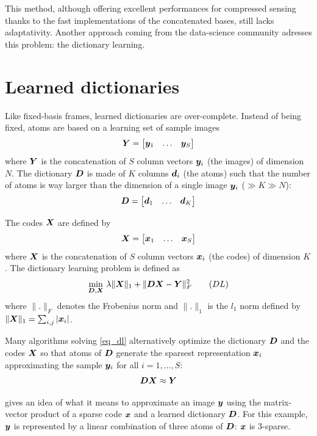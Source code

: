 This method, although offering excellent performances for compressed sensing thanks to the fast implementations of the concatenated bases, still lacks adaptativity. Another approach coming from the data-science community adresses this problem: the dictionary learning.

\section{Learned dictionaries}

Like fixed-basis frames, learned dictionaries are over-complete. Instead of being fixed, atoms are based on a learning set of sample images
$$\bm{Y} = \begin{bmatrix} \bm{y}_1 & \dots & \bm{y}_S \end{bmatrix}$$
where $\bm{Y}$ is the concatenation of $S$ column vectors $\bm{y}_i$ (the images) of dimension $N$. The dictionary $\bm{D}$ is made of $K$ columns $\bm{d}_i$ (the atoms) such that the number of atoms is way larger than the dimension of a single image $\bm{y}_i$ ($ \gg K \gg N$):
$$\bm{D} = \begin{bmatrix} \bm{d}_1 & \dots & \bm{d}_K \end{bmatrix}$$

The codes $\bm{X}$ are defined by
$$\bm{X} = \begin{bmatrix} \bm{x}_1 & \dots & \bm{x}_S \end{bmatrix}$$
where $\bm{X}$ is the concatenation of $S$ column vectors $\bm{x}_i$ (the codes) of dimension $K$. The dictionary learning problem is defined as
\begin{align}
\underset{\bm{D},\bm{X}}{\min}~ \lambda \lVert \bm{X} \rVert_1 + \lVert \bm{D}\bm{X}-\bm{Y} \rVert^2_F \tag{$DL$} \label{eq_dl}
\end{align}
where $\lVert . \rVert_F$ denotes the Frobenius norm and $\lVert . \rVert_1$ is the $l_1$ norm defined by $\lVert \bm{X} \rVert_1 = \sum_{i,j} |\bm{x}_i|$.

Many algorithms solving \eqref{eq_dl} alternatively optimize the dictionary $\bm{D}$ and the codes $\bm{X}$ so that atoms of $\bm{D}$ generate the sparsest representation $\bm{x}_i$ approximating the sample $\bm{y}_i$ for all $i = 1,\dots,S$:
$$\bm{D}\bm{X} \approx \bm{Y}$$

 gives an idea of what it means to approximate an image $\bm{y}$ using the matrix-vector product of a sparse code $\bm{x}$ and a learned dictionary $\bm{D}$. For this example, $\bm{y}$ is represented by a linear combination of three atoms of $\bm{D}$: $\bm{x}$ is 3-sparse.

